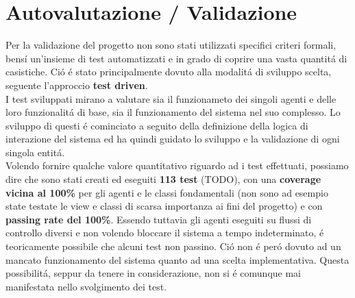 \section{Autovalutazione / Validazione}




Per la validazione del progetto non sono stati utilizzati specifici criteri formali, bens\'i un’insieme di test automatizzati e in grado di coprire una vasta quantit\'a di casistiche. Ci\'o \'e stato principalmente dovuto alla modalit\'a di sviluppo scelta, seguente l'approccio \textbf{test driven}.\\
I test sviluppati mirano a valutare sia il funzionameto dei singoli agenti e delle loro funzionalit\'a di base, sia il funzionamento del sistema nel suo complesso. Lo sviluppo di questi \'e cominciato a seguito della definizione della logica di interazione del sistema ed ha quindi guidato lo sviluppo e la validazione di ogni singola entit\'a.\\
Volendo fornire qualche valore quantitativo riguardo ad i test effettuati, possiamo dire che sono stati creati ed eseguiti \textbf{113 test} (TODO), con una \textbf{coverage vicina al 100\%} per gli agenti e le classi fondamentali (non sono ad esempio state testate le view e classi di scarsa importanza ai fini del progetto) e con \textbf{passing rate del 100\%}. Essendo tuttavia gli agenti eseguiti su flussi di controllo diversi e non volendo bloccare il sistema a tempo indeterminato, \'e teoricamente possibile che alcuni test non passino. Ci\'o non \'e per\'o dovuto ad un mancato funzionamento del sistema quanto ad una scelta implementativa. Questa possibilit\'a, seppur da tenere in considerazione, non si \'e comunque mai manifestata nello svolgimento dei test.

